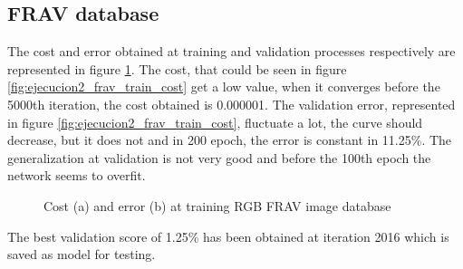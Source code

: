\subsection{FRAV database}
The cost and error obtained at training and validation processes respectively are represented in figure \ref{fig:ejecucion2_frav_train}. The cost, that could be seen in figure \ref{fig:ejecucion2_frav_train_cost} get a low value, when it converges before the 5000th iteration, the cost obtained is 0.000001. The validation error, represented in figure \ref{fig:ejecucion2_frav_train_cost}, fluctuate a lot, the curve should decrease, but it does not and in 200 epoch, the error is constant in 11.25\%. The generalization at validation is not very good and before the 100th epoch the network seems to overfit.\\
\begin{figure}[htb]
\centering
\caption{Cost (a) and error (b) at training RGB FRAV image database}
\label{fig:ejecucion2_frav_train}
\end{figure}

The best validation score of 1.25\% has been obtained at iteration 2016 which is saved as model for testing.\\

